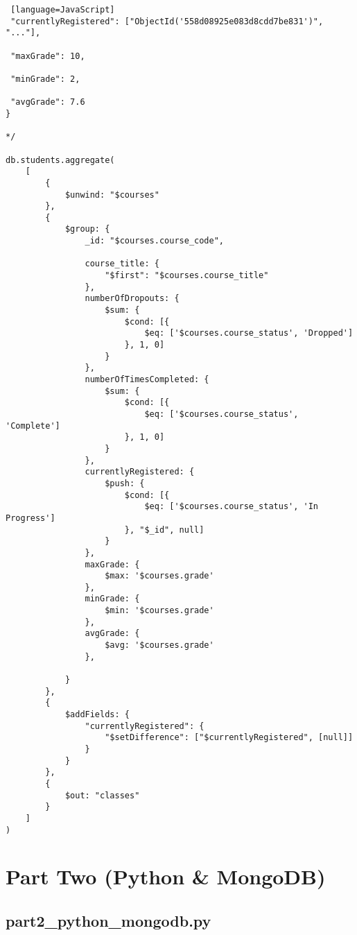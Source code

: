 \documentclass[11pt]{article}
\begin{document}
\begin{lstlisting} [language=JavaScript]
 "currentlyRegistered": ["ObjectId('558d08925e083d8cdd7be831')", "..."],

 "maxGrade": 10,

 "minGrade": 2,

 "avgGrade": 7.6
}

*/

db.students.aggregate(
    [
        {
            $unwind: "$courses"
        },
        {
            $group: {
                _id: "$courses.course_code",

                course_title: {
                    "$first": "$courses.course_title"
                },
                numberOfDropouts: {
                    $sum: {
                        $cond: [{
                            $eq: ['$courses.course_status', 'Dropped']
                        }, 1, 0]
                    }
                },
                numberOfTimesCompleted: {
                    $sum: {
                        $cond: [{
                            $eq: ['$courses.course_status', 'Complete']
                        }, 1, 0]
                    }
                },
                currentlyRegistered: {
                    $push: {
                        $cond: [{
                            $eq: ['$courses.course_status', 'In Progress']
                        }, "$_id", null]
                    }
                },
                maxGrade: {
                    $max: '$courses.grade'
                },
                minGrade: {
                    $min: '$courses.grade'
                },
                avgGrade: {
                    $avg: '$courses.grade'
                },

            }
        },
        {
            $addFields: {
                "currentlyRegistered": {
                    "$setDifference": ["$currentlyRegistered", [null]]
                }
            }
        },
        {
            $out: "classes"
        }
    ]
)

\end{lstlisting}

\section{Part Two (Python \& MongoDB)}\label{pymongo}

\subsection{part2\_python\_mongodb.py }\label{part2pythonmongodb.py}
\end{document}
